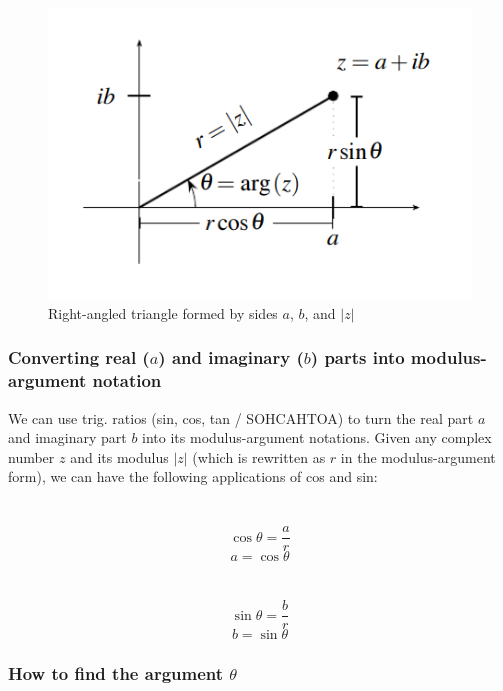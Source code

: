 \documentclass{article}
\begin{document}
\begin{figure}[H]
    \centering
    \includegraphics{../../../!assets/MATH1021-003-fig1.png}
    \caption{Right-angled triangle formed by sides $a$, $b$, and $|z|$}
\end{figure}

\subsubsection{Converting real ($a$) and imaginary ($b$) parts into modulus-argument notation}
We can use trig. ratios (sin, cos, tan / SOHCAHTOA) to turn the real part $a$ and imaginary part $b$ into its modulus-argument notations. Given any complex number $z$ and its modulus $|z|$ (which is rewritten as $r$ in the modulus-argument form), we can have the following applications of cos and sin:

\begin{multicols}{2}
    \section*{}
    \vspace{-\baselineskip} %
    $$\cos\theta=\frac{a}{r}$$
    $$a=\cos\theta$$

    \section*{}
    \vspace{-\baselineskip} %
    $$\sin\theta=\frac{b}{r}$$
    $$b=\sin\theta$$
    
\end{multicols}

\subsubsection{How to find the argument $\theta$}
\end{document}
